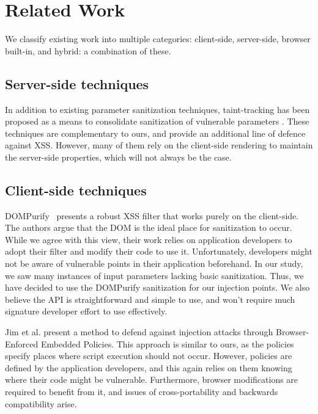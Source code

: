 \section{Related Work}
We classify existing work into multiple categories: client-side, server-side, browser built-in, and hybrid: a combination of these.

\subsection{Server-side techniques} In addition to existing parameter sanitization techniques, taint-tracking has been proposed as a means to consolidate sanitization of vulnerable parameters \cite{Xu:2006:TPE:1267336.1267345,DBLP:conf/sec/Nguyen-TuongGGSE05,Pietraszek:2005:DAI:2146257.2146267,Bisht:2008:XPD:1428322.1428325}. These techniques are complementary to ours, and provide an additional line of defence against \ac{XSS}. However, many of them rely on the client-side rendering to maintain the server-side properties, which will not always be the case.

\subsection{Client-side techniques} 

DOMPurify~\cite{10.1007/978-3-319-66399-9_7} presents a robust \ac{XSS} filter that works purely on the client-side. The authors argue that the DOM is the ideal place for sanitization to occur. While we agree with this view, their work relies on application developers to adopt their filter and modify their code to use it. Unfortunately, developers might not be aware of vulnerable points in their application beforehand. In our study, we saw many instances of input parameters lacking basic sanitization. Thus, we have decided to use the DOMPurify sanitization for our injection points. We also believe the API is straightforward and simple to use, and won't require much signature developer effort to use effectively.

Jim et al. \cite{Jim:2007:DSI:1242572.1242654} present a method to defend against injection attacks through Browser-Enforced Embedded Policies. This approach is similar to ours, as the policies specify places where script execution should not occur. However, policies are defined by the application developers, and this again relies on them knowing where their code might be vulnerable. Furthermore, browser modifications are required to benefit from it, and issues of cross-portability and backwards compatibility arise.


